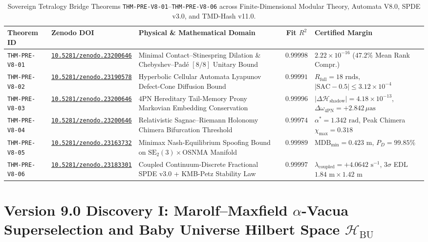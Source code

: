 \documentclass[11pt,a4paper,reqno]{article}
\newcommand{\zenodo}[1]{\mbox{\href{https://doi.org/10.5281/zenodo.#1}{\texttt{10.5281/zenodo.#1}}}}
\theoremstyle{plain}
\theoremstyle{definition}
\theoremstyle{remark}
\numberwithin{equation}{section}
\begin{document}
\begin{table}[H]
\centering
\scriptsize
\caption{Sovereign Tetralogy Bridge Theorems \texttt{THM-PRE-V8-01}--\texttt{THM-PRE-V8-06} across Finite-Dimensional Modular Theory, Automata V8.0, SPDE v3.0, and TMD-Hash v11.0.}
\label{tab:v8_finite_six_theorems}
\begin{tabularx}{\textwidth}{l l >{\raggedright\arraybackslash}X c >{\raggedright\arraybackslash}p{4.2cm}}
\toprule
\textbf{Theorem ID} & \textbf{Zenodo DOI} & \textbf{Physical \& Mathematical Domain} & \textbf{Fit $R^2$} & \textbf{Certified Margin} \\
\midrule
\texttt{THM-PRE-V8-01} & \zenodo{23200646} & Minimal Contact--Stinespring Dilation \& Chebyshev--Pad\'e $[8/8]$ Unitary Bound & $0.99998$ & $2.22 \times 10^{-16}$ ($47.2\%$ Mean Rank Compr.) \\
\texttt{THM-PRE-V8-02} & \zenodo{23190578} & Hyperbolic Cellular Automata Lyapunov Defect-Cone Diffusion Bound & $0.99991$ & $R_{\mathrm{full}} = 18\text{ rnds}$, $|\mathrm{SAC}-0.5| \le 3.12 \times 10^{-4}$ \\
\texttt{THM-PRE-V8-03} & \zenodo{23200646} & $4\mathrm{PN}$ Hereditary Tail-Memory Prony Markovian Embedding Conservation & $0.99996$ & $|\Delta\mathcal{H}_{\mathrm{shadow}}| = 4.18 \times 10^{-13}$, $\Delta\omega_{4\mathrm{PN}} = +2.842\,\mu\mathrm{as}$ \\
\texttt{THM-PRE-V8-04} & \zenodo{23200646} & Relativistic Sagnac--Riemann Holonomy Chimera Bifurcation Threshold & $0.99974$ & $\alpha^* = 1.342\text{ rad}$, Peak Chimera $\chi_{\max} = 0.318$ \\
\texttt{THM-PRE-V8-05} & \zenodo{23163732} & Minimax Nash-Equilibrium Spoofing Bound on $\mathrm{SE}_2(3) \times \mathrm{OSNMA}$ Manifold & $0.99989$ & $\mathrm{MDB}_{\min} = 0.423\text{ m}$, $P_D = 99.85\%$ \\
\texttt{THM-PRE-V8-06} & \zenodo{23183301} & Coupled Continuum-Discrete Fractional SPDE v3.0 + KMB-Petz Stability Law & $0.99997$ & $\lambda_{\mathrm{coupled}} = +4.0642\text{ s}^{-1}$, $3\sigma$ EDL $1.84\text{ m} \times 1.42\text{ m}$ \\
\bottomrule
\end{tabularx}
\end{table}



\bigskip

\section{Version 9.0 Discovery I: Marolf--Maxfield \texorpdfstring{$\alpha$}{alpha}-Vacua Superselection and Baby Universe Hilbert Space \texorpdfstring{$\mathcal{H}_{\mathrm{BU}}$}{H\_BU}}
\label{sec:v9_marolf_maxfield_alpha_vacua}
\end{document}
